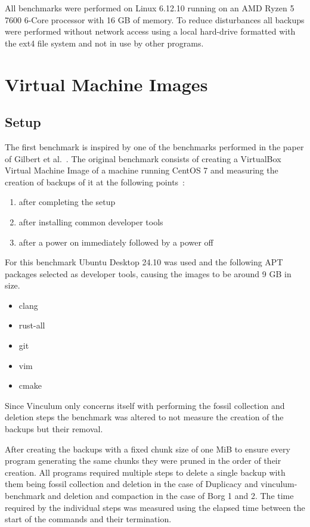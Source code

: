 All benchmarks were performed on Linux 6.12.10 running on an AMD Ryzen 5 7600 6-Core
processor with 16 GB of memory.
To reduce disturbances all backups were performed without network access using a
local hard-drive formatted with the ext4 file system and not in use by other programs.

\section{Virtual Machine Images}

\subsection{Setup}

The first benchmark is inspired by one of the benchmarks performed in the paper
of Gilbert et al.~\cite{Duplicacy}.
The original benchmark consists of creating a VirtualBox Virtual Machine Image
of a machine running CentOS 7 and measuring the creation of backups of it at
the following points~\cite[section `EVALUATION AND ANALYSIS']{Duplicacy}:
\begin{enumerate}
    \item after completing the setup
    \item after installing common developer tools
    \item after a power on immediately followed by a power off
\end{enumerate}

For this benchmark Ubuntu Desktop 24.10 was used and the following APT packages
selected as developer tools, causing the images to be around 9 GB in size.
\begin{itemize}
    \item clang
    \item rust-all
    \item git
    \item vim
    \item cmake
\end{itemize}

Since Vinculum only concerns itself with performing the fossil collection
and deletion steps the benchmark was altered to not measure the creation of
the backups but their removal.

After creating the backups with a fixed chunk size of one MiB to ensure every
program generating the same chunks they were pruned in the order of their creation.
All programs required multiple steps to delete a single backup with them being
fossil collection and deletion in the case of Duplicacy and vinculum-benchmark
and deletion and compaction in the case of Borg 1 and 2.
The time required by the individual steps was measured using the elapsed time
between the start of the commands and their termination.

